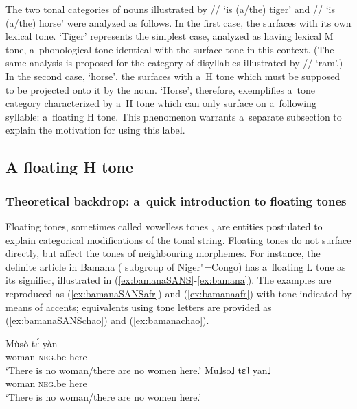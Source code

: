 The two tonal categories of nouns illustrated by // ‘is \mbox{(a/the)} tiger’ and // ‘is
(a/the) horse’ were analyzed as follows. In the first case, the  surfaces with its own
lexical tone. ‘Tiger’ represents the simplest case, analyzed as having lexical M tone, a~phonological tone
identical with the surface tone in this context. (The same analysis is proposed for the category
of disyllables illustrated by // ‘ram’.) In the second case, ‘horse’, the  surfaces with
a~H tone which must be supposed to be projected onto it by the noun. ‘Horse’, therefore, exemplifies
a~tone category characterized by a~H tone which can only surface on a~following syllable: a~floating
H tone. This phenomenon warrants a~separate subsection to explain the motivation for using this label.


\subsection{A floating H tone}
\label{sec:afloatinghtonewithcomparativeevidencepointingtoitsorigin}


\subsubsection{Theoretical backdrop: a~quick introduction to floating tones}
\label{sec:backdropfloating}

Floating tones, sometimes called vowelless tones \citep[84]{goldsmith2002}, are entities postulated to explain categorical modifications of the tonal string. Floating tones do not surface directly, but affect the tones of neighbouring morphemes. For instance, the definite article in Bamana ( subgroup of {Niger"=Congo}) has a~floating L tone as its signifier, illustrated in (\ref{ex:bamanaSANS}-\ref{ex:bamana}). The examples are reproduced as (\ref{ex:bamanaSANSafr}) and (\ref{ex:bamanaafr}) with tone indicated by means of accents; equivalents using tone letters are provided as (\ref{ex:bamanaSANSchao}) and (\ref{ex:bamanachao}).

\begin{exe}
  \ex
  \label{ex:bamanaSANS}
  \begin{xlist}
  	\ex
  	\label{ex:bamanaSANSafr}
  	\gll Mùsò tɛ́ yàn\\
  	woman \textsc{neg}.be here\\
  	\glt	‘There is no woman/there are no women here.’
  	\ex
  	\label{ex:bamanaSANSchao}
  	\gll Mu˩so˩ tɛ˥ yan˩\\
  	woman \textsc{neg}.be here\\
  	\glt	‘There is no woman/there are no women here.’
  \end{xlist}	
\end{exe}

